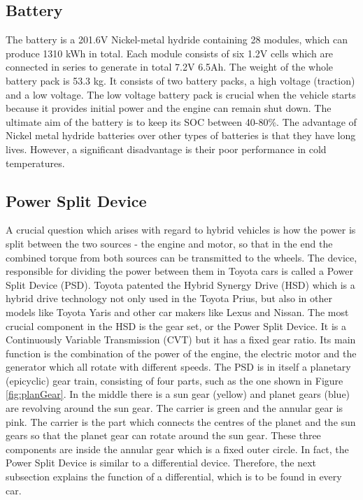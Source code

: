 \subsection{Battery}
The battery is a 201.6V Nickel-metal hydride containing 28 modules, which can produce 1310 kWh in total. Each module consists of six 1.2V cells which are connected in series to generate in total 7.2V 6.5Ah. The weight of the whole battery pack is 53.3 kg. It consists of two battery packs, a high voltage (traction) and a low voltage. The low voltage battery pack is crucial when the vehicle starts because it provides initial power and the engine can remain shut down. The ultimate aim of the battery is to keep its SOC between 40-80\%. The advantage of Nickel metal hydride batteries over other types of batteries is that they have long lives. However, a significant disadvantage is their poor performance in cold temperatures. 

\subsection{Power Split Device}
A crucial question which arises with regard to hybrid vehicles is how the power is split between the two sources - the engine and motor, so that in the end the combined torque from both sources can be transmitted to the wheels. The device, responsible for dividing the power between them in Toyota cars is called a Power Split Device (PSD). Toyota patented the Hybrid Synergy Drive (HSD) which is a hybrid drive technology not only used in the Toyota Prius, but also in other models like Toyota Yaris and other car makers like Lexus and Nissan. The most crucial component in the HSD is the gear set, or the Power Split Device. It is a Continuously Variable Transmission (CVT) but it has a fixed gear ratio. Its main function is the combination of the power of the engine, the electric motor and the generator which all rotate with different speeds. The PSD is in itself a planetary (epicyclic) gear train, consisting of four parts, such as the one shown in Figure \ref{fig:planGear}. In the middle there is a sun gear (yellow) and planet gears (blue) are revolving around the sun gear. The carrier is green and the annular gear is pink. The carrier is the part which connects the centres of the planet and the sun gears so that the planet gear can rotate around the sun gear. These three components are inside the annular gear which is a fixed outer circle. In fact, the Power Split Device is similar to a differential device. Therefore, the next subsection explains the function of a differential, which is to be found in every car.

